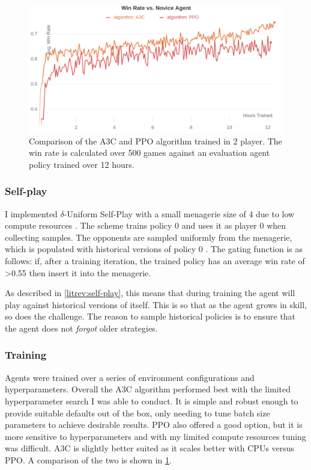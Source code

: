 \documentclass[../main.tex]{subfiles}
\begin{document}
\begin{figure}
    \centering
    \includegraphics[width=\textwidth]{images/method/ppo_vs_a3c.png}
    \caption{Comparison of the A3C and PPO algorithm trained in 2 player. The win rate is calculated over 500 games against an evaluation agent policy trained over 12 hours.}
    \label{fig:ppo-vs-a3c}
\end{figure}


\subsubsection{Self-play} \label{method:selfplay}

I implemented $\delta$-Uniform Self-Play with a small menagerie size of 4 due to low compute resources \cite{hernandez_comparison_2020}. The scheme trains policy 0 and uses it as player 0 when collecting samples. The opponents are sampled uniformly from the menagerie, which is populated with historical versions of policy 0 \cite{bansal_emergent_2018}. The gating function is as follows: if, after a training iteration, the trained policy has an average win rate of >0.55 then insert it into the menagerie. 

As described in \cref{litrev:self-play}, this means that during training the agent will play against historical versions of itself. This is so that as the agent grows in skill, so does the challenge. The reason to sample historical policies is to ensure that the agent does not \textit{forgot} older strategies. 

\subsubsection{Training}
Agents were trained over a series of environment configurations and hyperparameters. Overall the A3C algorithm performed best with the limited hyperparameter search I was able to conduct. It is simple and robust enough to provide suitable defaults out of the box, only needing to tune batch size parameters to achieve desirable results. PPO also offered a good option, but it is more sensitive to hyperparameters and with my limited compute resources tuning was difficult. A3C is slightly better suited as it scales better with CPUs versus PPO. A comparison of the two is shown in \cref{fig:ppo-vs-a3c}.
\end{document}
